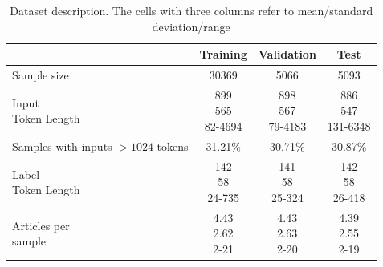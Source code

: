 \documentclass[12pt, twocolumn]{article}
\numberwithin{equation}{section}
\begin{document}
\begin{table}
    \small
    \begin{tabular}{|l|c|c|c|}
    \hline
        ~ & Training & Validation & Test  
        \\ \hline
        Sample size & 30369 & 5066 & 5093 
	\\ \hline
        \shortstack{Input\\Token Length}
	    & \shortstack{899 \\ 565 \\ 82-4694}
	    & \shortstack{898 \\ 567 \\ 79-4183}
	    & \shortstack{886 \\ 547 \\ 131-6348}
	\\ \hline
        \shortstack{Samples with\\inputs $>1024$\\tokens} & 31.21\% & 30.71\% & 30.87\% 
        \\ \hline
        \shortstack{Label\\Token Length}
	    & \shortstack{142 \\ 58 \\ 24-735}
	    & \shortstack{141 \\ 58 \\ 25-324}
	    & \shortstack{142 \\ 58 \\ 26-418}
	\\ \hline
        \shortstack{Articles per\\sample}
	    & \shortstack{4.43 \\ 2.62 \\ 2-21}
	    & \shortstack{4.43 \\ 2.63 \\ 2-20}
	    & \shortstack{4.39 \\ 2.55 \\ 2-19}
	 \\ \hline
    \end{tabular}
    \caption{Dataset description. The cells with three columns refer to mean/standard deviation/range}
    \label{tab:dataset-description}
\end{table}
\end{document}
